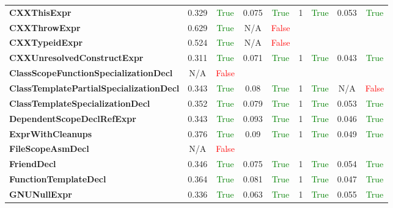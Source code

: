 \documentclass{article}
\begin{document}
\begin{xltabular}{\textwidth}{lcccccccc}
\textbf{{\fontsize{10}{12}\selectfont CXXThisExpr}}& 0.329&\textcolor{green}{True}& 0.075&\textcolor{green}{True}& 1&\textcolor{green}{True}& 0.053&\textcolor{green}{True} \\[0.5ex]
\textbf{{\fontsize{10}{12}\selectfont CXXThrowExpr}}& 0.629&\textcolor{green}{True}& N/A&\textcolor{red}{False} \\[0.5ex]
\textbf{{\fontsize{10}{12}\selectfont CXXTypeidExpr}}& 0.524&\textcolor{green}{True}& N/A&\textcolor{red}{False} \\[0.5ex]
\textbf{{\fontsize{10}{12}\selectfont CXXUnresolvedConstructExpr}}& 0.311&\textcolor{green}{True}& 0.071&\textcolor{green}{True}& 1&\textcolor{green}{True}& 0.043&\textcolor{green}{True} \\[0.5ex]
\textbf{{\fontsize{10}{12}\selectfont ClassScopeFunctionSpecializationDecl}}& N/A&\textcolor{red}{False} \\[0.5ex]
\textbf{{\fontsize{10}{12}\selectfont ClassTemplatePartialSpecializationDecl}}& 0.343&\textcolor{green}{True}& 0.08&\textcolor{green}{True}& 1&\textcolor{green}{True}& N/A&\textcolor{red}{False} \\[0.5ex]
\textbf{{\fontsize{10}{12}\selectfont ClassTemplateSpecializationDecl}}& 0.352&\textcolor{green}{True}& 0.079&\textcolor{green}{True}& 1&\textcolor{green}{True}& 0.053&\textcolor{green}{True} \\[0.5ex]
\textbf{{\fontsize{10}{12}\selectfont DependentScopeDeclRefExpr}}& 0.343&\textcolor{green}{True}& 0.093&\textcolor{green}{True}& 1&\textcolor{green}{True}& 0.046&\textcolor{green}{True} \\[0.5ex]
\textbf{{\fontsize{10}{12}\selectfont ExprWithCleanups}}& 0.376&\textcolor{green}{True}& 0.09&\textcolor{green}{True}& 1&\textcolor{green}{True}& 0.049&\textcolor{green}{True} \\[0.5ex]
\textbf{{\fontsize{10}{12}\selectfont FileScopeAsmDecl}}& N/A&\textcolor{red}{False} \\[0.5ex]
\textbf{{\fontsize{10}{12}\selectfont FriendDecl}}& 0.346&\textcolor{green}{True}& 0.075&\textcolor{green}{True}& 1&\textcolor{green}{True}& 0.054&\textcolor{green}{True} \\[0.5ex]
\textbf{{\fontsize{10}{12}\selectfont FunctionTemplateDecl}}& 0.364&\textcolor{green}{True}& 0.081&\textcolor{green}{True}& 1&\textcolor{green}{True}& 0.047&\textcolor{green}{True} \\[0.5ex]
\textbf{{\fontsize{10}{12}\selectfont GNUNullExpr}}& 0.336&\textcolor{green}{True}& 0.063&\textcolor{green}{True}& 1&\textcolor{green}{True}& 0.055&\textcolor{green}{True} \\[0.5ex]

\end{xltabular}
\end{document}
